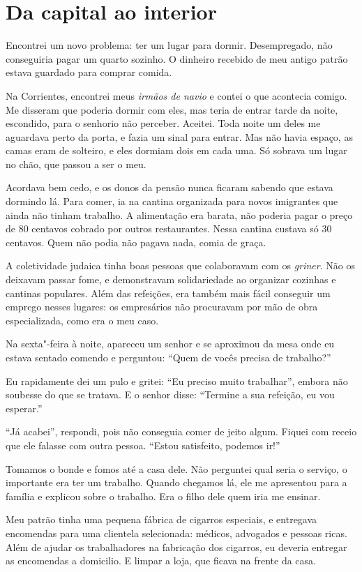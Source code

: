 \chapter{Da capital ao interior}

Encontrei um novo problema: ter um lugar para dormir. 
Desempregado, não conseguiria pagar um quarto sozinho. O dinheiro recebido de meu antigo 
patrão estava guardado para comprar comida.

Na Corrientes, encontrei meus \textit{irmãos de navio} e contei o 
que acontecia comigo. Me disseram que poderia dormir com eles, mas teria de
entrar tarde da noite, escondido, para o senhorio não perceber. Aceitei. Toda noite um deles me aguardava perto da porta, 
e fazia um sinal para entrar. Mas não havia espaço, as camas
eram de solteiro, e eles dormiam dois em cada uma. Só sobrava um lugar
no chão, que passou a ser o meu.

Acordava bem cedo, e os donos da pensão nunca ficaram sabendo que estava
dormindo lá. Para comer, ia na cantina organizada 
para novos imigrantes que ainda não tinham trabalho. A alimentação 
era barata, não poderia pagar o preço de
80 centavos cobrado por outros restaurantes. Nessa cantina custava só 30
centavos. Quem não podia não pagava nada, comia de graça.

A coletividade judaica tinha boas pessoas que colaboravam com os
\textit{griner}. Não os deixavam passar fome, e demonstravam solidariedade 
ao organizar cozinhas e cantinas populares. Além das refeições, era também mais
fácil conseguir um emprego nesses lugares: os empresários
não procuravam por mão de obra especializada, como era o meu caso.

Na sexta"-feira à noite, apareceu um senhor e se aproximou da mesa onde
eu estava sentado comendo e perguntou: ``Quem de vocês precisa de trabalho?''

Eu rapidamente dei um pulo e gritei: ``Eu preciso muito trabalhar'', embora não soubesse do que se tratava. E o senhor disse: ``Termine a sua refeição, eu vou esperar.''

``Já acabei'', respondi, pois não conseguia comer de jeito algum. Fiquei
com receio que ele falasse com outra pessoa. ``Estou satisfeito, podemos
ir!''

Tomamos o bonde e fomos até a casa dele. Não perguntei qual
seria o serviço, o importante era ter um trabalho. Quando
chegamos lá, ele me apresentou para a família e explicou sobre o
trabalho. Era o filho dele quem iria me ensinar.

Meu patrão tinha uma pequena fábrica de cigarros especiais, e
entregava encomendas para uma clientela selecionada: médicos,
advogados e pessoas ricas. Além de ajudar os trabalhadores na fabricação
dos cigarros, eu deveria entregar as encomendas a domicilio. E
limpar a loja, que ficava na frente da casa.

